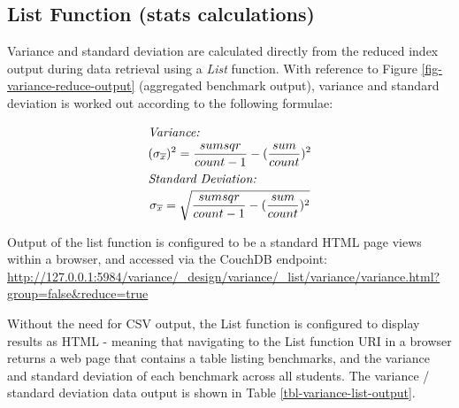 \subsection{List Function (stats calculations)}
Variance and standard deviation are calculated directly from the reduced index output during data retrieval using a \textit{List} function. With reference to Figure \ref{fig-variance-reduce-output} (aggregated benchmark output), variance and standard deviation is worked out according to the following formulae: \begin{spreadlines}{15pt}
  \begin{gather*}
    \intertext{\textit{Variance:}}
    (\sigma_{\overline{x}})^{2} = \frac{sumsqr}{count-1} - (\frac{sum}{count})^{2}\\
    \intertext{\textit{Standard Deviation:}}
    \sigma_{\overline{x}} = \sqrt{\frac{sumsqr}{count-1} - (\frac{sum}{count})^{2}}
  \end{gather*}
\end{spreadlines}

Output of the list function is configured to be a standard HTML page views within a browser, and accessed via the CouchDB endpoint: \url{http://127.0.0.1:5984/variance/_design/variance/_list/variance/variance.html?group=false&reduce=true}

Without the need for CSV output, the List function is configured to display results as HTML - meaning that navigating to the List function URI in a browser returns a web page that contains a table listing benchmarks, and the variance and standard deviation of each benchmark across all students. The variance / standard deviation data output is shown in Table \ref{tbl-variance-list-output}.


